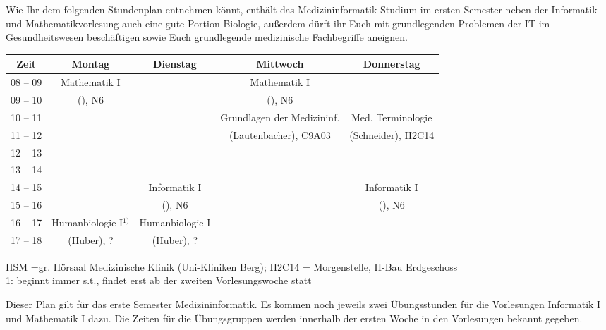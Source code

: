 Wie Ihr dem folgenden Stundenplan entnehmen könnt, enthält das Medizininformatik-Studium im ersten Semester neben der Informatik- und Mathematikvorlesung auch eine gute Portion Biologie, außerdem dürft ihr Euch mit grundlegenden Problemen der IT im Gesundheitswesen beschäftigen sowie Euch grundlegende medizinische Fachbegriffe aneignen.

\begin{center}
	\begin{tabular}{|c|c|c|c|c|} \hline
		Zeit      & 			Montag 		& Dienstag			& Mittwoch 						& Donnerstag 			 \\
		\hline\hline
		08 -- 09  & 		Mathematik I 	&  					& Mathematik I 					&  						\\
		\cline{1-1}\cline{3-3}\cline{5-5}			
		09 -- 10  & 	(\Matheprof), N6    & 					& (\Matheprof), N6 				 &  						\\
		\hline
		10 -- 11  &							&					& Grundlagen der Medizininf.	& Med. Terminologie		\\
		\cline{1-3}
		11 -- 12  & 						&  					& (Lautenbacher), C9A03			&(Schneider), H2C14		\\
		\hline
		12 -- 13 & 							& 				 	& 				    			& 						 \\
		\hline
		13 -- 14 & 							& 					& 								& 						 \\
		\hline
		14 -- 15 & 							& Informatik I 		& 								& Informatik I 			\\
		\cline{1-2}\cline{4-4}
		15 -- 16 &							& (\Infoprof), N6 	& 								& (\Infoprof), N6 		\\
		\hline
		16 -- 17 & Humanbiologie I$^{1)}$	& Humanbiologie I   & & \\
		\cline{1-1}\cline{4-5}
		17 -- 18 & (Huber), ?				& (Huber), ?		& &  \\
		\hline
	\end{tabular}
\scriptsize	
HSM =gr. Hörsaal Medizinische Klinik (Uni-Kliniken Berg); H2C14 = Morgenstelle, H-Bau Erdgeschoss\\
1: beginnt immer s.t., findet erst ab der zweiten Vorlesungswoche statt\\
\end{center}
Dieser Plan gilt für das erste Semester Medizininformatik. Es kommen noch jeweils zwei Übungsstunden für die Vorlesungen 
Informatik I und Mathematik I dazu. Die Zeiten für die Übungsgruppen werden innerhalb der ersten Woche in den Vorlesungen bekannt gegeben.
